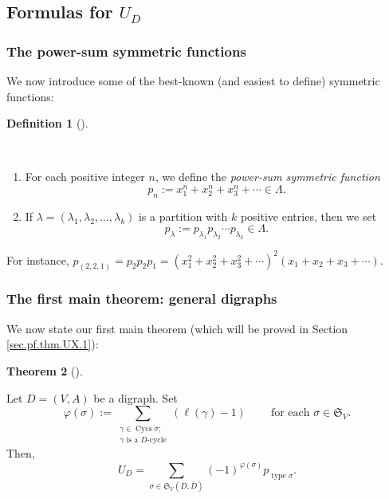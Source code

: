 \documentclass[numbers=enddot,12pt,final,onecolumn,notitlepage]{scrartcl}%
\numberwithin{exer}{section}
\theoremstyle{definition}
\newtheorem{theo}{Theorem}[section]
\newenvironment{theorem}[1][]
{\begin{theo}[#1]\begin{leftbar}}
{\end{leftbar}\end{theo}}
\newtheorem{defi}[theo]{Definition}
\newenvironment{definition}[1][]
{\begin{defi}[#1]\begin{leftbar}}
{\end{leftbar}\end{defi}}
\let\sumnonlimits\sum
\renewcommand{\sum}{\sumnonlimits\limits}
\begin{document}
\subsection{Formulas for $U_{D}$}

\subsubsection{The power-sum symmetric functions}

We now introduce some of the best-known (and easiest to define) symmetric functions:

\begin{definition}
\label{def.powersum}\ \ 

\begin{enumerate}
\item[\textbf{(a)}] For each positive integer $n$, we define the
\emph{power-sum symmetric function}
\[
p_{n}:=x_{1}^{n}+x_{2}^{n}+x_{3}^{n}+\cdots\in\Lambda.
\]


\item[\textbf{(b)}] If $\lambda=\left(  \lambda_{1},\lambda_{2},\ldots
,\lambda_{k}\right)  $ is a partition with $k$ positive entries, then we set%
\[
p_{\lambda}:=p_{\lambda_{1}}p_{\lambda_{2}}\cdots p_{\lambda_{k}}\in\Lambda.
\]

\end{enumerate}
\end{definition}

For instance, $p_{\left(  2,2,1\right)  }=p_{2}p_{2}p_{1}=\left(  x_{1}%
^{2}+x_{2}^{2}+x_{3}^{2}+\cdots\right)  ^{2}\left(  x_{1}+x_{2}+x_{3}%
+\cdots\right)  $.

\subsubsection{The first main theorem: general digraphs}

We now state our first main theorem (which will be proved in Section
\ref{sec.pf.thm.UX.1}):


\begin{theorem}
\label{thm.UX.1}Let $D=\left(  V,A\right)  $ be a digraph. Set%
\[
\varphi\left(  \sigma\right)  :=\sum_{\substack{\gamma\in\operatorname*{Cycs}%
\sigma;\\\gamma\text{ is a }D\text{-cycle}}}\left(  \ell\left(  \gamma\right)
-1\right)  \ \ \ \ \ \ \ \ \ \ \text{for each }\sigma\in\mathfrak{S}_{V}.
\]
Then,%
\[
U_{D}=\sum_{\sigma\in\mathfrak{S}_{V}\left(  D,\overline{D}\right)  }\left(
-1\right)  ^{\varphi\left(  \sigma\right)  }p_{\operatorname*{type}\sigma}.
\]

\end{theorem}
\end{document}
